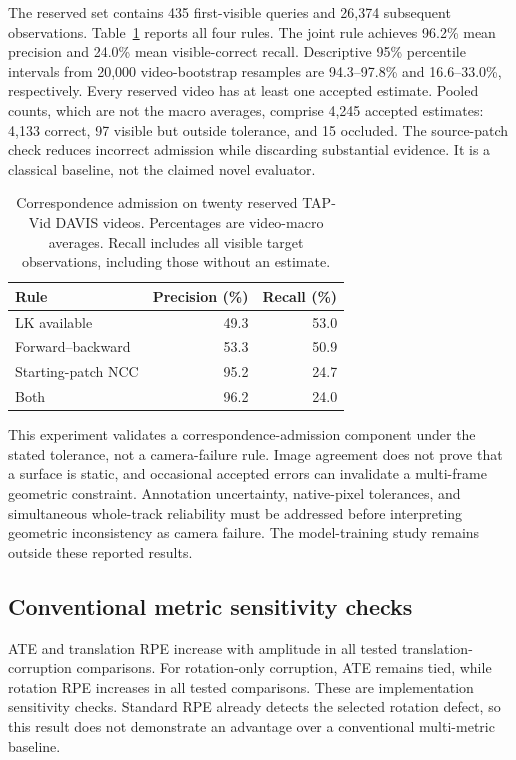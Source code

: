 \documentclass[10pt,twocolumn]{article}
\begin{document}
The reserved set contains 435 first-visible queries and 26,374 subsequent observations. Table~\ref{tab:correspondence} reports all four rules. The joint rule achieves 96.2\% mean precision and 24.0\% mean visible-correct recall. Descriptive 95\% percentile intervals from 20,000 video-bootstrap resamples are 94.3--97.8\% and 16.6--33.0\%, respectively. Every reserved video has at least one accepted estimate. Pooled counts, which are not the macro averages, comprise 4,245 accepted estimates: 4,133 correct, 97 visible but outside tolerance, and 15 occluded. The source-patch check reduces incorrect admission while discarding substantial evidence. It is a classical baseline, not the claimed novel evaluator.

\begin{table}[t]
\centering
\caption{Correspondence admission on twenty reserved TAP-Vid DAVIS videos. Percentages are video-macro averages. Recall includes all visible target observations, including those without an estimate.}
\label{tab:correspondence}
\begin{tabular}{lrr}
\toprule
Rule & Precision (\%) & Recall (\%)\\
\midrule
LK available & 49.3 & 53.0\\
Forward--backward & 53.3 & 50.9\\
Starting-patch NCC & 95.2 & 24.7\\
Both & 96.2 & 24.0\\
\bottomrule
\end{tabular}
\end{table}

This experiment validates a correspondence-admission component under the stated tolerance, not a camera-failure rule. Image agreement does not prove that a surface is static, and occasional accepted errors can invalidate a multi-frame geometric constraint. Annotation uncertainty, native-pixel tolerances, and simultaneous whole-track reliability must be addressed before interpreting geometric inconsistency as camera failure. The model-training study remains outside these reported results.

\subsection{Conventional metric sensitivity checks}
ATE and translation RPE increase with amplitude in all tested translation-corruption comparisons. For rotation-only corruption, ATE remains tied, while rotation RPE increases in all tested comparisons. These are implementation sensitivity checks. Standard RPE already detects the selected rotation defect, so this result does not demonstrate an advantage over a conventional multi-metric baseline.
\end{document}
